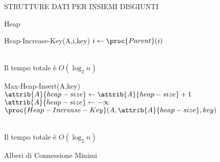 \documentclass[8pt]{extarticle}
\begin{document}
\begin{formulario}
\begin{myParagraph}{STRUTTURE DATI PER INSIEMI DISGIUNTI}
\begin{subParagraph}{Heap}
\begin{code}{Heap-Increase-Key(A,i,key)}
	\li $i\get \proc{Parent}(i)$
\END
				\end{code}
\\
Il tempo totale è $O(\log_2 n)$\\
				\begin{code}{Max-Heap-Insert(A,key)}
\li $\attrib{A}{heap-size}\get \attrib{A}{heap-size}+1$
\li $\attrib{A}{heap-size}\get -\infty$
\li $\proc{Heap-Increase-Key}(A,\attrib{A}{heap-size},key)$
				\end{code}
\\
Il tempo totale è $O(\log_2 n)$\\
			\end{subParagraph}
			\begin{subParagraph}{Alberi di Connessione Minimi}
			
			\end{subParagraph}
	
	
	
	
	
	
	
	
	
	
	
	
	
	
	
	
	
	
	
	
	
	

	\end{myParagraph}
\end{formulario}
\end{document}
